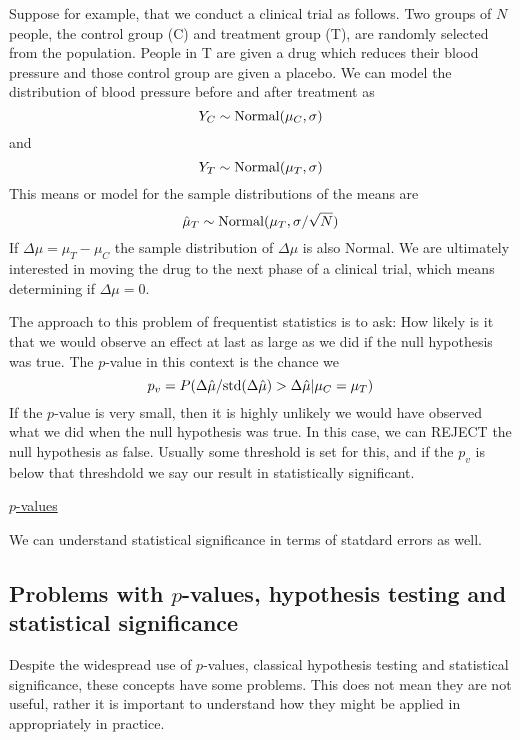 Suppose for example, that we conduct a clinical trial as follows. Two groups of $N$ people, the control group (C) and treatment group (T), are randomly selected from the population. People in T are given a drug which reduces their blood pressure and those control group are given a placebo. We can model the distribution of blood pressure before and after treatment as 
\begin{equation}
Y_C \sim {\rm Normal}(\mu_C,\sigma)
\end{equation}
and 
\begin{equation}
Y_T \sim {\rm Normal}(\mu_T,\sigma)
\end{equation}
This means or model for the sample distributions of the means are 
\begin{equation}
\hat{\mu}_T \sim {\rm Normal}(\mu_T,\sigma/\sqrt{N})
\end{equation}
If  $\Delta \mu = \mu_T-\mu_C$ the sample distribution of $\Delta \mu$ is also Normal. We are ultimately interested in moving the drug to the next phase of a clinical trial, which means determining if $\Delta \mu =0$. 


The approach to this problem of frequentist statistics is to ask: How likely is it that we would observe an effect at last as large as we did if the null hypothesis was true. The $p$-value in this context is the chance we  
\begin{equation}
p_v = P(\Delta \hat{\mu}/{\rm std}(\Delta \hat{\mu}) > \Delta \hat{\mu}|\mu_C = \mu_T)
\end{equation}
If the $p$-value is very small, then it is highly unlikely we would have observed what we did when the null hypothesis was true. In this case, we can REJECT the null hypothesis as false. Usually some threshold is set for this, and if the $p_v$ is below that threshdold we say our result in statistically significant. 

\begin{exercise}
\href{https://colab.research.google.com/drive/1QarJhwPmSqCTQ-HwU_lXCUX6uvdhLdrM#scrollTo=f3odqYsslqkj&line=3&uniqifier=1}{$p$-values}
\end{exercise} 

We can understand statistical significance in terms of statdard errors as well. 


\subsection{Problems with $p$-values, hypothesis testing and statistical significance}
Despite the widespread use of $p$-values, classical hypothesis testing and statistical significance, these concepts have some problems. This does not mean they are not useful, rather it is important to understand how they might be applied in appropriately in practice. 

